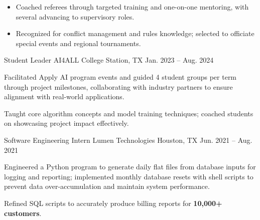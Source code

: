 \begin{cventries}
{\begin{cvitems}
{      \begin{itemize}
      \item Coached referees through targeted training and one-on-one mentoring, with several advancing to supervisory roles.
      \item Recognized for conflict management and rules knowledge; selected to officiate special events and regional tournaments.
      \end{itemize}
      }
    \end{cvitems}
  }
  \cventry
  {Student Leader} %
  {AI4ALL} %
  {College Station, TX} %
  {Jan. 2023 -- Aug. 2024} %
  {
   \begin{cvitems}
    \item {Facilitated Apply AI program events and guided 4 student groups per term through project milestones, collaborating with industry partners to ensure alignment with real-world applications.}
    \item {Taught core algorithm concepts and model training techniques; coached students on showcasing project impact effectively.}
    \end{cvitems}
  }
\cventry
    {Software Engineering Intern} %
    {Lumen Technologies} %
    {Houston, TX} %
    {Jun. 2021 -- Aug. 2021} %
    {
      \begin{cvitems}
      \item {Engineered a Python program to generate daily flat files from database inputs for logging and reporting; implemented monthly database resets with shell scripts to prevent data over-accumulation and maintain system performance.
      }
      \item {Refined SQL scripts to accurately produce billing reports for \textbf{10,000+ customers}.
      }
      \end{cvitems}
    }
\end{cventries}


